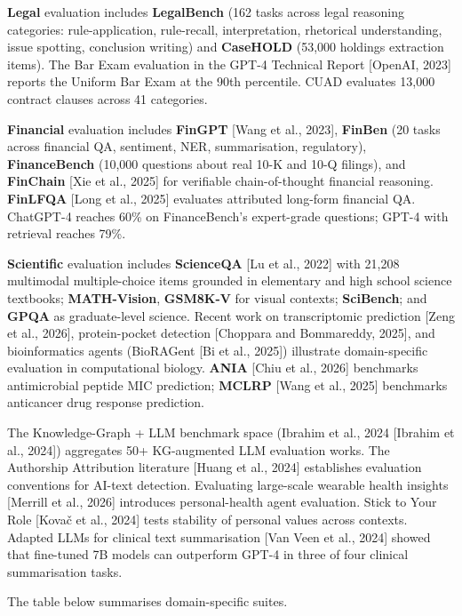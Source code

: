 \textbf{Legal} evaluation includes \textbf{LegalBench} (162 tasks across legal reasoning categories: rule-application, rule-recall, interpretation, rhetorical understanding, issue spotting, conclusion writing) and \textbf{CaseHOLD} (53,000 holdings extraction items). The Bar Exam evaluation in the GPT-4 Technical Report {[}OpenAI, 2023{]} reports the Uniform Bar Exam at the 90th percentile. CUAD evaluates 13,000 contract clauses across 41 categories.

\textbf{Financial} evaluation includes \textbf{FinGPT} {[}Wang et al., 2023{]}, \textbf{FinBen} (20 tasks across financial QA, sentiment, NER, summarisation, regulatory), \textbf{FinanceBench} (10,000 questions about real 10-K and 10-Q filings), and \textbf{FinChain} {[}Xie et al., 2025{]} for verifiable chain-of-thought financial reasoning. \textbf{FinLFQA} {[}Long et al., 2025{]} evaluates attributed long-form financial QA. ChatGPT-4 reaches 60\% on FinanceBench's expert-grade questions; GPT-4 with retrieval reaches 79\%.

\textbf{Scientific} evaluation includes \textbf{ScienceQA} {[}Lu et al., 2022{]} with 21,208 multimodal multiple-choice items grounded in elementary and high school science textbooks; \textbf{MATH-Vision}, \textbf{GSM8K-V} for visual contexts; \textbf{SciBench}; and \textbf{GPQA} as graduate-level science. Recent work on transcriptomic prediction {[}Zeng et al., 2026{]}, protein-pocket detection {[}Choppara and Bommareddy, 2025{]}, and bioinformatics agents (BioRAGent {[}Bi et al., 2025{]}) illustrate domain-specific evaluation in computational biology. \textbf{ANIA} {[}Chiu et al., 2026{]} benchmarks antimicrobial peptide MIC prediction; \textbf{MCLRP} {[}Wang et al., 2025{]} benchmarks anticancer drug response prediction.

The Knowledge-Graph + LLM benchmark space (Ibrahim et al., 2024 {[}Ibrahim et al., 2024{]}) aggregates 50+ KG-augmented LLM evaluation works. The Authorship Attribution literature {[}Huang et al., 2024{]} establishes evaluation conventions for AI-text detection. Evaluating large-scale wearable health insights {[}Merrill et al., 2026{]} introduces personal-health agent evaluation. Stick to Your Role {[}Kovač et al., 2024{]} tests stability of personal values across contexts. Adapted LLMs for clinical text summarisation {[}Van Veen et al., 2024{]} showed that fine-tuned 7B models can outperform GPT-4 in three of four clinical summarisation tasks.

The table below summarises domain-specific suites.

